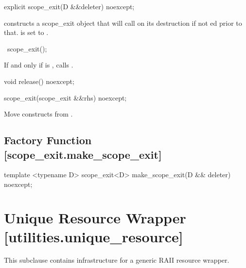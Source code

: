 \documentclass[ebook,11pt,article]{memoir}
\begin{document}
\begin{itemdecl}
explicit
scope_exit(D &&deleter) noexcept;
\end{itemdecl}


\pnum
\effects constructs a scope_exit object that will call  on its destruction if not ed prior to that.  is set to .

\begin{itemdecl}
~scope_exit();
\end{itemdecl}

\pnum
\effects If and only if  is , calls .


\begin{itemdecl}
void release() noexcept;
\end{itemdecl}

\pnum
\effects {}

\begin{itemdecl}
scope_exit(scope_exit  &&rhs) noexcept;
\end{itemdecl}

\pnum
\effects Move constructs  from . 

\subsection {Factory Function  [scope_exit.make_scope_exit]}

\begin{itemdecl}
template <typename D>
scope_exit<D> make_scope_exit(D && deleter) noexcept;
\end{itemdecl}

\pnum
\returns {}




\section{Unique Resource Wrapper [utilities.unique_resource]}
This subclause contains infrastructure for a generic RAII resource wrapper.
\end{document}
